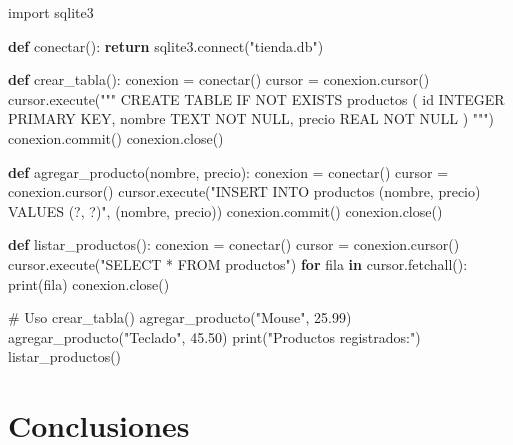 \documentclass[
  a4paper,
  DIV=11,
  numbers=noendperiod,
  onepage,
  openany]{scrreprt}
\newenvironment{Shaded}{\begin{snugshade}}{\end{snugshade}}
\newcommand{\BuiltInTok}[1]{\textcolor[rgb]{0.00,0.23,0.31}{#1}}
\newcommand{\CommentTok}[1]{\textcolor[rgb]{0.37,0.37,0.37}{#1}}
\newcommand{\ControlFlowTok}[1]{\textcolor[rgb]{0.00,0.23,0.31}{\textbf{#1}}}
\newcommand{\ExtensionTok}[1]{\textcolor[rgb]{0.00,0.23,0.31}{#1}}
\newcommand{\FloatTok}[1]{\textcolor[rgb]{0.68,0.00,0.00}{#1}}
\newcommand{\ImportTok}[1]{\textcolor[rgb]{0.00,0.46,0.62}{#1}}
\newcommand{\KeywordTok}[1]{\textcolor[rgb]{0.00,0.23,0.31}{\textbf{#1}}}
\newcommand{\NormalTok}[1]{\textcolor[rgb]{0.00,0.23,0.31}{#1}}
\newcommand{\OperatorTok}[1]{\textcolor[rgb]{0.37,0.37,0.37}{#1}}
\newcommand{\StringTok}[1]{\textcolor[rgb]{0.13,0.47,0.30}{#1}}
\begin{document}
\begin{Shaded}
\begin{Highlighting}[]
\ImportTok{import}\NormalTok{ sqlite3}

\KeywordTok{def}\NormalTok{ conectar():}
    \ControlFlowTok{return}\NormalTok{ sqlite3.}\ExtensionTok{connect}\NormalTok{(}\StringTok{"tienda.db"}\NormalTok{)}

\KeywordTok{def}\NormalTok{ crear\_tabla():}
\NormalTok{    conexion }\OperatorTok{=}\NormalTok{ conectar()}
\NormalTok{    cursor }\OperatorTok{=}\NormalTok{ conexion.cursor()}
\NormalTok{    cursor.execute(}\StringTok{"""}
\StringTok{    CREATE TABLE IF NOT EXISTS productos (}
\StringTok{        id INTEGER PRIMARY KEY,}
\StringTok{        nombre TEXT NOT NULL,}
\StringTok{        precio REAL NOT NULL}
\StringTok{    )}
\StringTok{    """}\NormalTok{)}
\NormalTok{    conexion.commit()}
\NormalTok{    conexion.close()}

\KeywordTok{def}\NormalTok{ agregar\_producto(nombre, precio):}
\NormalTok{    conexion }\OperatorTok{=}\NormalTok{ conectar()}
\NormalTok{    cursor }\OperatorTok{=}\NormalTok{ conexion.cursor()}
\NormalTok{    cursor.execute(}\StringTok{"INSERT INTO productos (nombre, precio) VALUES (?, ?)"}\NormalTok{, (nombre, precio))}
\NormalTok{    conexion.commit()}
\NormalTok{    conexion.close()}

\KeywordTok{def}\NormalTok{ listar\_productos():}
\NormalTok{    conexion }\OperatorTok{=}\NormalTok{ conectar()}
\NormalTok{    cursor }\OperatorTok{=}\NormalTok{ conexion.cursor()}
\NormalTok{    cursor.execute(}\StringTok{"SELECT * FROM productos"}\NormalTok{)}
    \ControlFlowTok{for}\NormalTok{ fila }\KeywordTok{in}\NormalTok{ cursor.fetchall():}
        \BuiltInTok{print}\NormalTok{(fila)}
\NormalTok{    conexion.close()}

\CommentTok{\# Uso}
\NormalTok{crear\_tabla()}
\NormalTok{agregar\_producto(}\StringTok{"Mouse"}\NormalTok{, }\FloatTok{25.99}\NormalTok{)}
\NormalTok{agregar\_producto(}\StringTok{"Teclado"}\NormalTok{, }\FloatTok{45.50}\NormalTok{)}
\BuiltInTok{print}\NormalTok{(}\StringTok{"Productos registrados:"}\NormalTok{)}
\NormalTok{listar\_productos()}
\end{Highlighting}
\end{Shaded}

\chapter{Conclusiones}\label{conclusiones-8}
\end{document}
